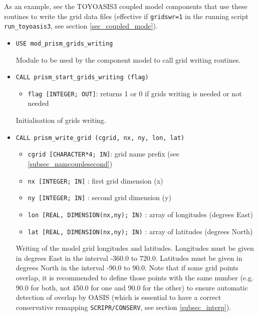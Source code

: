 As an example, see the TOYOASIS3 coupled model components that 
use these routines to write the grid data
files (effective if \texttt{gridswr=1} in the running script
\texttt{run\_toyoasis3},  
see section \ref{sec_coupled_mode}).


\begin{itemize}
\item {\tt USE  mod\_prism\_grids\_writing}

Module to be used by the component model to call grid writing routines.
  
\item {\tt CALL  prism\_start\_grids\_writing (flag)}
        
  \begin{itemize}
    \item {\tt flag [INTEGER; OUT]}:  returns 1 or 0 if grids writing is
    needed or not needed
  \end{itemize}
Initialisation of grids writing.

\item {\tt CALL prism\_write\_grid (cgrid, nx, ny, lon, lat)}
        
 \begin{itemize}
    \item {\tt cgrid [CHARACTER*4; IN]}: grid name prefix (see
    \ref{subsec_namcouplesecond})
    \item {\tt nx [INTEGER; IN]} : first grid dimension (x)
    \item {\tt ny [INTEGER; IN]} : second grid dimension (y)
    \item {\tt lon [REAL, DIMENSION(nx,ny); IN)} : array of longitudes
      (degrees East) 
    \item {\tt lat [REAL, DIMENSION(nx,ny); IN)} : array of latitudes
    (degrees North)
 \end{itemize}

 Writing of the model grid longitudes and latitudes. Longitudes must
 be given in degrees East in the interval -360.0 to 720.0. Latitudes
 must be given in degrees North in the interval -90.0 to 90.0. Note
 that if some grid points overlap, it is recommended to define those
 points with the same number (e.g. 90.0 for both, not 450.0 for one
 and 90.0 for the other) to ensure automatic detection of overlap by OASIS
 (which is essential to have a correct conservative remapping
 \texttt{SCRIPR/CONSERV}, see section \ref{subsec_interp}). 



\end{itemize}
